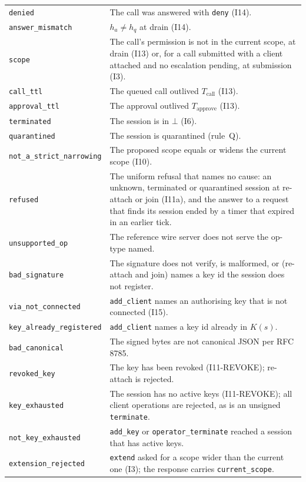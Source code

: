\begin{longtable}{p{} p{}}
\texttt{denied} & The call was answered with \texttt{deny} (I14). \\
\texttt{answer\_mismatch} & $h_a \neq h_q$ at drain (I14). \\
\texttt{scope} & The call's permission is not in the current scope, at drain (I13) or, for a call submitted with a client attached and no escalation pending, at submission (I3). \\
\texttt{call\_ttl} & The queued call outlived $T_{\text{call}}$ (I13). \\
\texttt{approval\_ttl} & The approval outlived $T_{\text{approve}}$ (I13). \\
\texttt{terminated} & The session is in $\bot$ (I6). \\
\texttt{quarantined} & The session is quarantined (rule~Q). \\
\texttt{not\_a\_strict\_narrowing} & The proposed scope equals or widens the current scope (I10). \\
\texttt{refused} & The uniform refusal that names no cause: an unknown, terminated or quarantined session at re-attach or join (I11a), and the answer to a request that finds its session ended by a timer that expired in an earlier tick. \\
\texttt{unsupported\_op} & The reference wire server does not serve the op-type named. \\
\texttt{bad\_signature} & The signature does not verify, is malformed, or (re-attach and join) names a key id the session does not register. \\
\texttt{via\_not\_connected} & \texttt{add\_client} names an authorising key that is not connected (I15). \\
\texttt{key\_already\_registered} & \texttt{add\_client} names a key id already in $K(s)$. \\
\texttt{bad\_canonical} & The signed bytes are not canonical JSON per RFC 8785. \\
\texttt{revoked\_key} & The key has been revoked (I11-REVOKE); re-attach is rejected. \\
\texttt{key\_exhausted} & The session has no active keys (I11-REVOKE); all client operations are rejected, as is an unsigned \texttt{terminate}. \\
\texttt{not\_key\_exhausted} & \texttt{add\_key} or \texttt{operator\_terminate} reached a session that has active keys. \\
\texttt{extension\_rejected} & \texttt{extend} asked for a scope wider than the current one (I3); the response carries \texttt{current\_scope}. \\

\end{longtable}
